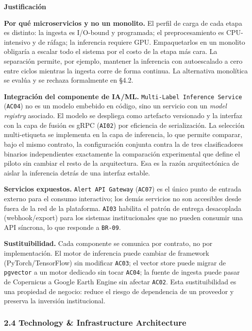 \documentclass{article}
\newcommand{\mdhfour}[1]{\par\medskip\noindent\textbf{#1}\par\nobreak\smallskip}
\begin{document}
\mdhfour{Justificación}

\textbf{Por qué microservicios y no un monolito.} El perfil de carga de cada etapa es distinto: la ingesta es I/O-bound y programada; el preprocesamiento es CPU-intensivo y de ráfaga; la inferencia requiere GPU. Empaquetarlos en un monolito obligaría a escalar todo el sistema por el costo de la etapa más cara. La separación permite, por ejemplo, mantener la inferencia con autoescalado a cero entre ciclos mientras la ingesta corre de forma continua. La alternativa monolítica se evalúa y se rechaza formalmente en \S{}4.2.

\textbf{Integración del componente de IA/ML.} \texttt{Multi-\allowbreak{}Label Inference Service} (\texttt{AC04}) no es un modelo embebido en código, sino un servicio con un \emph{model registry} asociado. El modelo se despliega como artefacto versionado y la interfaz con la capa de fusión es gRPC (\texttt{AI02}) por eficiencia de serialización. La selección multi-etiqueta se implementa en la capa de inferencia, lo que permite comparar, bajo el mismo contrato, la configuración conjunta contra la de tres clasificadores binarios independientes \textemdash{}exactamente la comparación experimental que define el piloto\textemdash{} sin cambiar el resto de la arquitectura. Esa es la razón arquitectónica de aislar la inferencia detrás de una interfaz estable.

\textbf{Servicios expuestos.} \texttt{Alert API Gateway} (\texttt{AC07}) es el único punto de entrada externo para el consumo interactivo; los demás servicios no son accesibles desde fuera de la red de la plataforma. \texttt{AI03} habilita el patrón de entrega desacoplada (webhook/export) para los sistemas institucionales que no pueden consumir una API síncrona, lo que responde a \texttt{BR-\allowbreak{}09}.

\textbf{Sustituibilidad.} Cada componente se comunica por contrato, no por implementación. El motor de inferencia puede cambiar de framework (PyTorch/TensorFlow) sin modificar \texttt{AC03}; el vector store puede migrar de \texttt{pgvector} a un motor dedicado sin tocar \texttt{AC04}; la fuente de ingesta puede pasar de Copernicus a Google Earth Engine sin afectar \texttt{AC02}. Esta sustituibilidad es una propiedad de negocio: reduce el riesgo de dependencia de un proveedor y preserva la inversión institucional.

\subsubsection{2.4 Technology \& Infrastructure Architecture}
\end{document}
